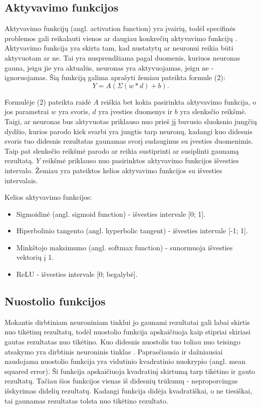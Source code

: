 \documentclass{VUMIFPSbakalaurinis}
\begin{document}
\subsection{Aktyvavimo funkcijos}
Aktyvavimo funkcijų (angl. activation function) yra įvairių, todėl specifinės problemos gali reikalauti vienos ar daugiau konkrečių aktyvavimo funkcijų \cite{activation}.
Aktyvavimo funkcija yra skirta tam, kad nustatytų ar neuronui reikia būti aktyvuotam ar ne. Tai yra nusprendžiama pagal duomenis, kuriuos neuronas gauna, jeigu jie yra aktualūs, neuronas yra aktyvuojamas, jeigu ne - ignoruojamas.
Šią funkciją galima aprašyti žemiau pateikta formule (2):
\begin{equation}
Y = A(\Sigma{(w * d) + b}).
\end{equation}

Formulėje (2) pateikta raidė \(A\) reiškia bet kokia pasirinkta aktyvavimo funkcija, o jos parametrai \(w\) yra svoris, \(d\) yra įvesties duomenys ir \(b\) yra slenksčio reikšmė. Taigi, ar neuronas bus aktyvuotas priklauso nuo prieš jį 
buvusio sluoksnio jungčių dydžio, kurios parodo kiek svarbi yra jungtis tarp neuronų, kadangi kuo didesnis svoris tuo didesnis rezultatas gaunamas svorį sudauginus su įvesties duomenimis. Taip pat slenksčio reikšmė parodo ar reikia 
sustiprinti ar susiplinti gaunamą rezultatą. \(Y\) reikšmė priklauso nuo pasirinktos aktyvavimo funkcijos išvesties intervalo. Žemiau yra pateiktos kelios aktyvavimo funkcijos su išvesties intervalais.  

Kelios aktyvavimo funkcijos:
\begin{itemize}
\item Sigmoidinė (angl. sigmoid function) - išvesties intervale [0; 1].
\item Hiperbolinio tangento (angl. hyperbolic tangent) - išvesties intervale [-1; 1].
\item Minkštojo maksimumo (angl. softmax function) - sunormuoja išvesties vektorių į 1.
\item ReLU - išvesties intervale [0; begalybė].
\end{itemize}

\subsection{Nuostolio funkcijos}
Mokantis dirbtiniam neuroniniam tinklui jo gaunami rezultatai gali labai skirtis nuo tikėtinų rezultatų, todėl nuostolio funkcija apskaičiuoja kaip stipriai
skiriasi gautas rezultatas nuo tikėtino. Kuo didesnis nuostolis tuo toliau nuo teisingo atsakymo yra dirbtinis neuroninis tinklas \cite{Cameron-loss-fun}.
Paprasčiausia ir dažniausiai naudojama nuostolio funkcija yra vidutinio kvadratinio nuokrypio (angl. mean squared error). Ši funkcija apskaičiuoja kvadratinį skirtumą tarp tikėtino 
ir gauto rezultatų. Tačiau šios funkcijos vienas iš didesnių trūkumų - neproporcingas išskyrimas didelių rezultatų. Kadangi funkcija didėja kvadratiškai,
o ne tiesiškai, tai gaunamas rezultatas tolsta nuo tikėtino rezultato.
\end{document}
